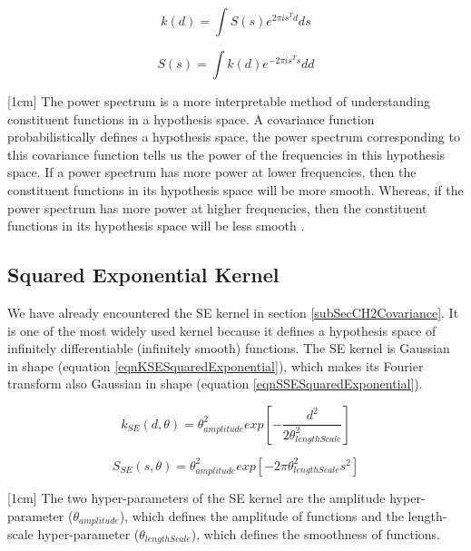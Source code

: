 \begin{equation}\label{eqCh4StationaryCovariance}
    k(d) = \int S(s) e^{2 \pi is^{T} d}ds
\end{equation}

\begin{equation}\label{eqCh4StationaryPowerSpectrum}
    S(s) = \int k(d) e^{-2 \pi is^{T} s}dd 
\end{equation}

[1cm]
The power spectrum is a more interpretable method of understanding constituent functions in a hypothesis space. A covariance function probabilistically defines a hypothesis space, the power spectrum corresponding to this covariance function tells us the power of the frequencies in this hypothesis space. If a power spectrum has more power at lower frequencies, then the constituent functions in its hypothesis space will be more smooth. Whereas, if the power spectrum has more power at higher frequencies, then the constituent functions in its hypothesis space will be less smooth \cite{wilson2014thesis}. 

\subsection{Squared Exponential Kernel}\label{subSecCh4SEKernel}
We have already encountered the SE kernel in section \ref{subSecCH2Covariance}. It is one of the most widely used kernel because it defines a hypothesis space of infinitely differentiable (infinitely smooth) functions. The SE kernel is Gaussian in shape (equation \ref{eqnKSESquaredExponential}), which makes its Fourier transform also Gaussian in shape (equation \ref{eqnSSESquaredExponential}).  

\begin{equation}\label{eqnKSESquaredExponential}
k_{SE}(d, \theta) = \theta_{amplitude}^2exp \left [-\frac{d^2}{2\theta_{lengthScale}^2} \right ]
\end{equation}

\begin{equation}\label{eqnSSESquaredExponential}
S_{SE}(s, \theta) = \theta_{amplitude}^2  exp \left [-2\pi \theta_{lengthScale}^2 s^2 \right]
\end{equation}

[1cm]
The two hyper-parameters of the SE kernel are the amplitude hyper-parameter ($\theta_{amplitude}$), which defines the amplitude of functions and the length-scale hyper-parameter ($\theta_{lengthScale}$), which defines the smoothness of functions. 

